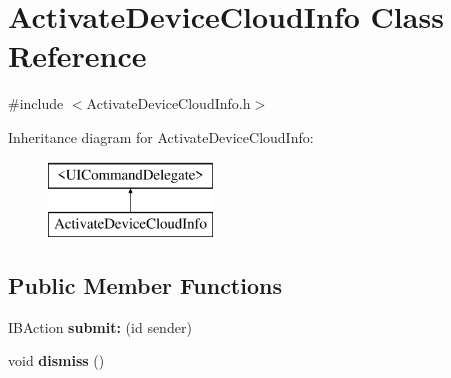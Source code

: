 \hypertarget{interface_activate_device_cloud_info}{
\section{\-Activate\-Device\-Cloud\-Info \-Class \-Reference}
\label{interface_activate_device_cloud_info}
}


{\ttfamily \#include $<$\-Activate\-Device\-Cloud\-Info.\-h$>$}

\-Inheritance diagram for \-Activate\-Device\-Cloud\-Info\-:\begin{figure}[H]
\begin{center}
\leavevmode
\includegraphics[height=2.000000cm]{interface_activate_device_cloud_info}
\end{center}
\end{figure}
\subsection*{\-Public \-Member \-Functions}
\begin{DoxyCompactItemize}
\item 
\hypertarget{interface_activate_device_cloud_info_af439795da5a7cfc55383de11b6ffbe3d}{
\-I\-B\-Action {\bfseries submit\-:} (id sender)}
\label{interface_activate_device_cloud_info_af439795da5a7cfc55383de11b6ffbe3d}

\item 
\hypertarget{interface_activate_device_cloud_info_a459418e389b308476d1fb1a099f9dc04}{
void {\bfseries dismiss} ()}
\label{interface_activate_device_cloud_info_a459418e389b308476d1fb1a099f9dc04}

\end{DoxyCompactItemize}
